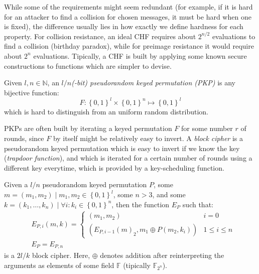 \noindent While some of the requirements might seem redundant (for example, if it is hard for an
attacker to find a collision for chosen messages, it must be hard when one is fixed),
the difference usually lies in how exactly we define hardness for each property.
For collision resistance, an ideal CHF requires about \(2^{n/2}\) evaluations to find a collision
(birthday paradox), while for preimage resistance it would require about \(2^n\) evaluations.
Tipically, a CHF is built by applying some known secure constructions to functions which are
simpler to devise.
\begin{definition}
	Given \(l, n \in \mathbb{N}\), an \emph{\(l/n\)(-bit) pseudorandom keyed permutation (PKP)} is
	any bijective function:
	\[F\colon {\left\{0, 1\right\}}^l \times {\left\{0, 1\right\}}^n \mapsto {\left\{0, 1\right\}}^l\]
	which is hard to distinguish from an uniform random distribution.
\end{definition}

\noindent PKPs are often built by iterating a keyed permutation \(F\) for some number \(r\) of
rounds, since \(F\) by itself might be relatively easy to invert.
A \emph{block cipher} is a pseudorandom keyed permutation which is easy to invert if we know
the key (\emph{trapdoor function}), and which is iterated for a certain number of rounds using
a different key everytime, which is provided by a key-scheduling function.
\begin{theorem}
	Given a \(l/n\) pseudorandom keyed permutation \(P\), some
	\(m = \left(m_1, m_2\right) \mid m_1, m_2 \in {\left\{0, 1\right\}}^l\), some \(n > 3\), and some
	\(k = \left(k_1, \dots, k_n\right) \mid \forall i\colon k_i \in {\left\{0, 1\right\}}^n\), then
	the function \(E_P\) such that:
	\begin{align*}
		 & E_{P, i}\left(m, k\right) =
		\begin{cases}
			\left(m_1, m_2\right)                                                        & i = 0
			\\
			\left({E_{P, i-1}\left(m\right)}_2, m_1 \oplus P\left(m_2, k_i\right)\right) & 1 \le
			i \le n
		\end{cases} \\
		 & E_P	= E_{P,n}
	\end{align*}
	is a \(2l/k\) block cipher.
	Here, \(\oplus \) denotes addition after reinterpreting the arguments as elements of some
	field \(\mathbb{F}\) (tipically \(\mathbb{F}_{2^n}\)).

\end{theorem}

